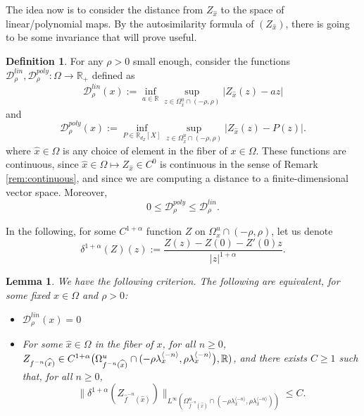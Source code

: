 \documentclass[a4paper]{article}
\newtheorem{lemma}[theorem]{Lemma}
\theoremstyle{definition}
\newtheorem{definition}{Definition}[section]
\newtheorem{remark}[example]{Remark}
\begin{document}
The idea now is to consider the distance from $Z_{\widehat{x}}$ to the space of linear/polynomial maps. By the autosimilarity formula of $(Z_{\widehat{x}})$, there is going to be some invariance that will prove useful. 
\begin{definition}
For any $\rho>0$ small enough, consider the functions $\mathcal{D}_\rho^{lin}, \mathcal{D}_\rho^{poly}  : \Omega \longrightarrow \mathbb{R}_+$ defined as
$$ \mathcal{D}_\rho^{lin}(x) := \inf_{a \in \mathbb{R}} \sup_{z \in \Omega_{\widehat{x}}^u \cap (-\rho,\rho)} | Z_{\widehat{x}}(z) - a z | $$
and $$ \mathcal{D}_\rho^{poly}(x) := \inf_{P \in \mathbb{R}_{d_Z}[X]} \sup_{z \in \Omega_{\widehat{x}}^u \cap (-\rho,\rho)} | Z_{\widehat{x}}(z) - P(z) |. $$
where $\widehat{x} \in \widehat{\Omega}$ is any choice of element in the fiber of $x \in \Omega$. These functions are continuous, since $\widehat{x} \in \Omega \mapsto Z_{\widehat{x}} \in C^0$ is continuous in the sense of Remark \ref{rem:continuous}, and since we are computing a distance to a finite-dimensional vector space. Moreover,
$$ 0 \leq \mathcal{D}_{\rho}^{poly} \leq \mathcal{D}_{\rho}^{lin}. $$
\end{definition}
In the following, for some $C^{1+\alpha}$ function $Z$ on $\Omega_x^u \cap(-\rho,\rho)$, let us denote $$ \delta^{1+\alpha}(Z)(z) := \frac{Z(z)-Z(0)-Z'(0)z}{|z|^{1+\alpha}} .$$
\begin{lemma}
We have the following criterion. The following are equivalent, for some fixed $x \in \Omega$ and $\rho>0$:
\begin{itemize}
\item $\mathcal{D}_\rho^{lin}(x)=0$
\item For some $\widehat{x} \in \Omega$ in the fiber of $x$, for all $n \geq 0$, $Z_{f^{-n}(\widehat{x})} \in C^{1+\alpha}\big{(}\Omega_{f^{-n}(\widehat{x})}^u \cap (-\rho \lambda_x^{\langle -n \rangle } , \rho \lambda_x^{\langle -n \rangle}\big{)},\mathbb{R}) $, and there exists $C \geq 1$ such that, for all $n \geq 0$, $$\| \delta^{1+\alpha}(Z_{\widehat{f}^{-n}(\widehat{x})}) \|_{L^\infty( \Omega_{\widehat{f}^{-n}(\widehat{x})}^u \cap (-\rho \lambda_x^{\langle -n \rangle } , \rho \lambda_x^{\langle -n \rangle}) )} \leq C.$$
\end{itemize}
\end{lemma}
\end{document}

